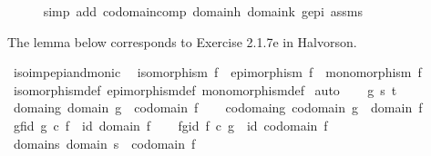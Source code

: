 \begin{isabellebody}
\ \ \ \ \isamarkupfalse%
\ {\isacharparenleft}{\kern0pt}simp\ add{\isacharcolon}{\kern0pt}\ codomain{\isacharunderscore}{\kern0pt}comp\ domain{\isacharunderscore}{\kern0pt}h\ domain{\isacharunderscore}{\kern0pt}k\ g{\isacharunderscore}{\kern0pt}epi\ assms{\isacharparenright}{\kern0pt}\isanewline
{}\isamarkupfalse%
%
\endisatagproof
{\isafoldproof}%
%
\isadelimproof
%
\endisadelimproof
%
\begin{isamarkuptext}%
The lemma below corresponds to Exercise 2.1.7e in Halvorson.%
\end{isamarkuptext}\isamarkuptrue%
\isamarkupfalse%
\ iso{\isacharunderscore}{\kern0pt}imp{\isacharunderscore}{\kern0pt}epi{\isacharunderscore}{\kern0pt}and{\isacharunderscore}{\kern0pt}monic{\isacharcolon}{\kern0pt}\isanewline
\ \ {\isachardoublequoteopen}isomorphism\ f\ {\isasymLongrightarrow}\ epimorphism\ f\ {\isasymand}\ monomorphism\ f{\isachardoublequoteclose}\isanewline
%
\isadelimproof
\ \ %
\endisadelimproof
%
\isatagproof
{}\isamarkupfalse%
\ isomorphism{\isacharunderscore}{\kern0pt}def\ epimorphism{\isacharunderscore}{\kern0pt}def\ monomorphism{\isacharunderscore}{\kern0pt}def\isanewline
{}\isamarkupfalse%
\ auto\isanewline
\ \ \isamarkupfalse%
\ g\ s\ t\isanewline
\ \ \isamarkupfalse%
\ domain{\isacharunderscore}{\kern0pt}g{\isacharcolon}{\kern0pt}\ {\isachardoublequoteopen}domain\ g\ {\isacharequal}{\kern0pt}\ codomain\ f{\isachardoublequoteclose}\isanewline
\ \ \isamarkupfalse%
\ codomain{\isacharunderscore}{\kern0pt}g{\isacharcolon}{\kern0pt}\ {\isachardoublequoteopen}codomain\ g\ {\isacharequal}{\kern0pt}\ domain\ f{\isachardoublequoteclose}\isanewline
\ \ \isamarkupfalse%
\ gf{\isacharunderscore}{\kern0pt}id{\isacharcolon}{\kern0pt}\ {\isachardoublequoteopen}g\ {\isasymcirc}\isactrlsub c\ f\ {\isacharequal}{\kern0pt}\ id\ {\isacharparenleft}{\kern0pt}domain\ f{\isacharparenright}{\kern0pt}{\isachardoublequoteclose}\isanewline
\ \ \isamarkupfalse%
\ fg{\isacharunderscore}{\kern0pt}id{\isacharcolon}{\kern0pt}\ {\isachardoublequoteopen}f\ {\isasymcirc}\isactrlsub c\ g\ {\isacharequal}{\kern0pt}\ id\ {\isacharparenleft}{\kern0pt}codomain\ f{\isacharparenright}{\kern0pt}{\isachardoublequoteclose}\isanewline
\ \ \isamarkupfalse%
\ domain{\isacharunderscore}{\kern0pt}s{\isacharcolon}{\kern0pt}\ {\isachardoublequoteopen}domain\ s\ {\isacharequal}{\kern0pt}\ codomain\ f{\isachardoublequoteclose}\isanewline
\ \ \isamarkupfalse%

\end{isabellebody}
